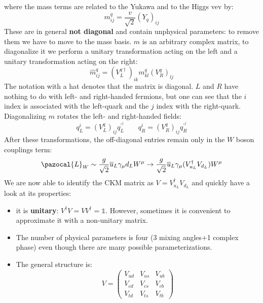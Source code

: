 \documentclass[../main.tex]{subfiles}
\begin{document}
where the mass terms are related to the Yukawa and to the Higgs vev by:
\[
m_{ij}^q=\frac{v}{\sqrt{2}}(Y_q)_{ij}
\]
These are in general \textbf{not diagonal} and contain unphysical parameters: to remove them we have to move to the mass basis. $m$ is an arbitrary complex matrix, to diagonalize it we perform a unitary transformation acting on the left and a unitary transformation acting on the right:
\[
\hat{m}_{ij}^q=(V_L^{q\dagger})_{ik}m_{kl}^q(V_R^q)_{lj}
\]
The notation with a hat denotes that the matrix is diagonal. $L$ and $R$ have nothing to do with left- and right-handed fermions, but one can see that the $i$ index is associated with the left-quark and the $j$ index with the right-quark. Diagonalizing $m$ rotates the left- and right-handed fields:
\[
q_L^i=(V_L^q)_{ij}q_L^{'^j} \qquad q_R^i=(V_R^q)_{ij}q_R^{'^j}
\]
After these transformations, the off-diagonal entries remain only in the $W$ boson couplings term:
\[
\pazocal{L}_W\sim\frac{g}{\sqrt{2}}\overline{u}_L\gamma_\mu d_LW^\mu\to\frac{g}{\sqrt{2}}\overline{u}_L\gamma_\mu(V_{u_L}^\dagger V_{d_L})W^\mu
\]
We are now able to identify the CKM matrix as $V=V_{u_L}^\dagger V_{d_L}$ and quickly have a look at its properties:
\begin{itemize}
    \item it is \textbf{unitary}: $V^\dagger V=VV^\dagger=\mathbb{1}$. However, sometimes it is convenient to approximate it with a non-unitary matrix.
    \item The number of physical parameters is four (3 mixing angles+1 complex phase) even though there are many possible parameterizations.
    \item The general structure is:
    \[
    V=\left(\begin{array}{ccc}
    V_{ud} & V_{us} & V_{ub} \\
    V_{cd} & V_{cs} & V_{cb} \\
    V_{td} & V_{ts} & V_{tb}
\end{array}\right)
    \]
\end{itemize}
\end{document}

